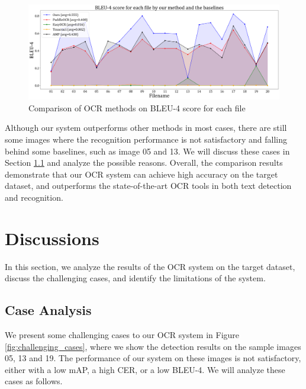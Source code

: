 \documentclass[12pt,twoside]{report}
\begin{document}
\begin{figure}[htbp]
    \centering
    \includegraphics[width=\textwidth]{./figures/comp_bleu.png}
    \caption{Comparison of OCR methods on BLEU-4 score for each file}
    \label{fig:comp_bleu}
\end{figure}

Although our system outperforms other methods in most cases, there are still some images where the recognition performance is not satisfactory and falling behind some baselines, such as image 05 and 13. We will discuss these cases in Section \ref{sec:case_analysis} and analyze the possible reasons. Overall, the comparison results demonstrate that our OCR system can achieve high accuracy on the target dataset, and outperforms the state-of-the-art OCR tools in both text detection and recognition.

\section{Discussions}
\label{sec:discussions}
In this section, we analyze the results of the OCR system on the target dataset, discuss the challenging cases, and identify the limitations of the system.

\subsection{Case Analysis}
\label{sec:case_analysis}
We present some challenging cases to our OCR system in Figure \ref{fig:challenging_cases}, where we show the detection results on the sample images 05, 13 and 19. The performance of our system on these images is not satisfactory, either with a low mAP, a high CER, or a low BLEU-4. We will analyze these cases as follows.
\end{document}
